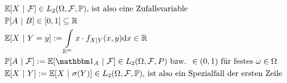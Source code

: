\begin{lösung}
	\begin{align*}
		&\E[X~|~\F]\in L_2(\Omega,\F,\P)\text{, ist also eine Zufallsvariable}\\
		&\P[A~|~B]\in[0,1]\subseteq\R\\
		&\E[X~|~Y=y]:=\int\limits_{\R^m}x\cdot f_{X|Y}(x,y)\d x\in\R\\
		&\P[A~|~\F]:=\E[\indi_A~|~\F]\in L_2(\Omega,\F,P)\text{ bzw. }\in(0,1)\text{ für festes }\omega\in\Omega\\
		&\E[X~|~Y]:=\E[X~|~\sigma(Y)]\in L_2(\Omega,\F,\P)\text{, ist also ein Spezialfall der ersten Zeile}
	\end{align*}
\end{lösung}
